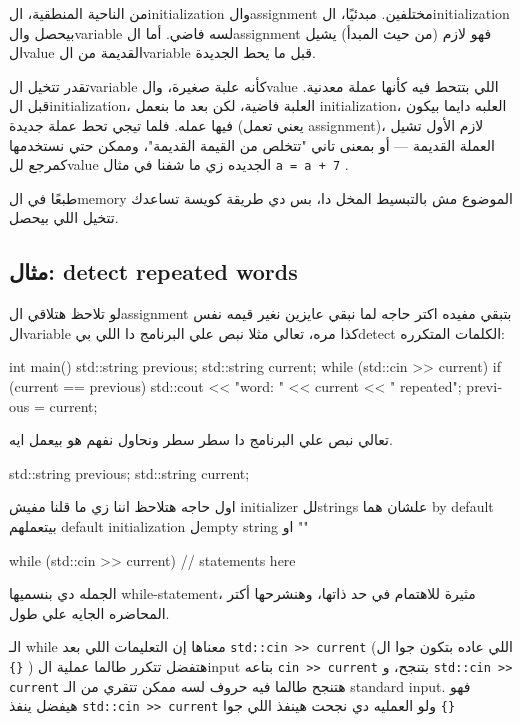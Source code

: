 \documentclass[11pt]{article}
\let\OriginalVerbatim\verbatim
\let\endOriginalVerbatim\endverbatim
\renewenvironment{verbatim}{\begin{english}\OriginalVerbatim}{\endOriginalVerbatim\end{english}}
\begin{document}
من الناحية المنطقية، الinitialization والassignment مختلفين. مبدئيًا، الinitialization بيحصل والvariable لسه فاضي. أما الassignment فهو لازم (من حيث المبدأ) يشيل الvalue القديمة من الvariable قبل ما يحط الجديدة.

تقدر تتخيل الvariable كأنه علبة صغيرة، والvalue اللي بتتحط فيه كأنها عملة معدنية. قبل الinitialization، العلبة فاضية، لكن بعد ما بنعمل initialization، العلبه دايما بيكون فيها عمله. فلما تيجي تحط عملة جديدة (يعني تعمل assignment)، لازم الأول تشيل العملة القديمة — أو بمعنى تاني "تتخلص من القيمة القديمة"، وممكن حتي نستخدمها كمرجع للvalue الجديده زي ما شفنا في مثال \texttt{a = a + 7} .

طبعًا في الmemory الموضوع مش بالتبسيط المخل دا، بس دي طريقة كويسة تساعدك تتخيل اللي بيحصل.
\subsection{مثال: detect repeated words}
\label{sec:org430a5ad}
لو تلاحظ هتلاقي الassignment بتبقي مفيده اكتر حاجه لما نبقي عايزين نغير قيمه نفس الvariable كذا مره، تعالي مثلا نبص علي البرنامج دا اللي بيdetect الكلمات المتكرره:

\begin{verbatim}
int main() {
    std::string previous;
    std::string current;
    while (std::cin >> current) {
        if (current == previous) {
            std::cout << "word: " << current << " repeated\n";
        }
        previous = current;
    }
}
\end{verbatim}

تعالي نبص علي البرنامج دا سطر سطر ونحاول نفهم هو بيعمل ايه.

\begin{verbatim}
std::string previous;
std::string current;
\end{verbatim}

اول حاجه هتلاحظ اننا زي ما قلنا مفيش initializer للstrings علشان هما by default بيتعملهم default initialization لempty string او ""

\begin{verbatim}
while (std::cin >> current) {
    // statements here
}
\end{verbatim}

الجمله دي بنسميها while-statement، مثيرة للاهتمام في حد ذاتها، وهنشرحها أكتر المحاضره الجايه علي طول.

الـ while معناها إن التعليمات اللي بعد \texttt{std::cin >{}>{} current} (اللي عاده بتكون جوا ال \texttt{\{\}} ) هتفضل تتكرر طالما عملية الinput بتاعه \texttt{cin >{}>{} current} بتنجح، و \texttt{std::cin >{}>{} current} هتنجح طالما فيه حروف لسه ممكن تتقري من الـ standard input. فهو هيفضل ينفذ \texttt{std::cin >{}>{} current} ولو العمليه دي نجحت هينفذ اللي جوا \texttt{\{\}}
\end{document}
